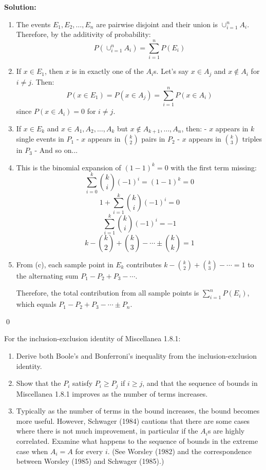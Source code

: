 \noindent\textbf{Solution:}
\begin{enumerate}[label=(\alph*)]
    \item The events $E_1, E_2, \ldots, E_n$ are pairwise disjoint and their union is $\cup_{i=1}^{n} A_i$. Therefore, by the additivity of probability:
    \[ P(\cup_{i=1}^{n} A_i) = \sum_{i=1}^{n} P(E_i) \]
    
    \item If $x \in E_1$, then $x$ is in exactly one of the $A_i$s. Let's say $x \in A_j$ and $x \notin A_i$ for $i \neq j$. Then:
    \[ P(x \in E_1) = P(x \in A_j) = \sum_{i=1}^{n} P(x \in A_i) \]
    since $P(x \in A_i) = 0$ for $i \neq j$.
    
    \item If $x \in E_k$ and $x \in A_1, A_2, \ldots, A_k$ but $x \notin A_{k+1}, \ldots, A_n$, then:
    - $x$ appears in $k$ single events in $P_1$
    - $x$ appears in $\binom{k}{2}$ pairs in $P_2$
    - $x$ appears in $\binom{k}{3}$ triples in $P_3$
    - And so on...
    
    \item This is the binomial expansion of $(1 - 1)^k = 0$ with the first term missing:
    \[ \sum_{i=0}^{k} \binom{k}{i} (-1)^i = (1 - 1)^k = 0 \]
    \[ 1 + \sum_{i=1}^{k} \binom{k}{i} (-1)^i = 0 \]
    \[ \sum_{i=1}^{k} \binom{k}{i} (-1)^i = -1 \]
    \[ k - \binom{k}{2} + \binom{k}{3} - \cdots \pm \binom{k}{k} = 1 \]
    
    \item From (c), each sample point in $E_k$ contributes $k - \binom{k}{2} + \binom{k}{3} - \cdots = 1$ to the alternating sum $P_1 - P_2 + P_3 - \cdots$.
    
    Therefore, the total contribution from all sample points is $\sum_{i=1}^{n} P(E_i)$, which equals $P_1 - P_2 + P_3 - \cdots \pm P_n$.
\end{enumerate}



\qed
\begin{problembox}
For the inclusion-exclusion identity of Miscellanea 1.8.1:
\begin{enumerate}[label=(\alph*)]
    \item Derive both Boole's and Bonferroni's inequality from the inclusion-exclusion identity.
    \item Show that the $P_{i}$ satisfy $P_{i}\geq P_{j}$ if $i\geq j$, and that the sequence of bounds in Miscellanea 1.8.1 improves as the number of terms increases.
    \item Typically as the number of terms in the bound increases, the bound becomes more useful. However, Schwager (1984) cautions that there are some cases where there is not much improvement, in particular if the $A_{i}$s are highly correlated. Examine what happens to the sequence of bounds in the extreme case when $A_{i}=A$ for every $i$. (See Worsley (1982) and the correspondence between Worsley (1985) and Schwager (1985).)
\end{enumerate}
\end{problembox}

